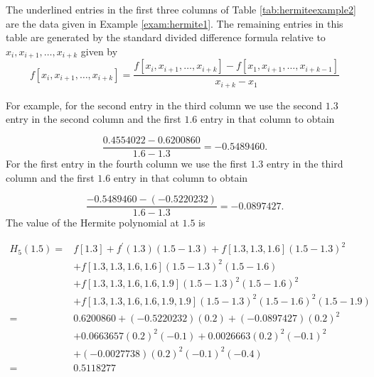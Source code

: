 \begin{mysolution}The underlined entries in the first three columns of Table \ref{tab:hermiteexample2} are the data given in Example \ref{exam:hermite1}. The remaining entries in this table are generated by the standard divided difference formula relative to $x_i, x_{i+1}, \ldots, x_{i+k}$ given by
\[f[x_i, x_{i+1}, \ldots, x_{i+k}]=\frac{f[x_i, x_{i+1}, \ldots, x_{i+k}]-f[x_1, x_{i+1}, \ldots, x_{i+k-1}]}{x_{i+k}-x_1}\]

For example, for the second entry in the third column we use the second $1.3$ entry in the second column and the first $1.6$ entry in that column to obtain

$$
\frac{0.4554022-0.6200860}{1.6-1.3}=-0.5489460 .
$$
For the first entry in the fourth column we use the first $1.3$ entry in the third column and the first $1.6$ entry in that column to obtain

$$
\frac{-0.5489460-(-0.5220232)}{1.6-1.3}=-0.0897427 .
$$
The value of the Hermite polynomial at $1.5$ is

$$
\begin{aligned}
H_{5}(1.5)= & f[1.3]+f^{\prime}(1.3)(1.5-1.3)+f[1.3,1.3,1.6](1.5-1.3)^{2} \\
& +f[1.3,1.3,1.6,1.6](1.5-1.3)^{2}(1.5-1.6) \\
& +f[1.3,1.3,1.6,1.6,1.9](1.5-1.3)^{2}(1.5-1.6)^{2} \\
& +f[1.3,1.3,1.6,1.6,1.9,1.9](1.5-1.3)^{2}(1.5-1.6)^{2}(1.5-1.9) \\
= & 0.6200860+(-0.5220232)(0.2)+(-0.0897427)(0.2)^{2} \\
& +0.0663657(0.2)^{2}(-0.1)+0.0026663(0.2)^{2}(-0.1)^{2} \\
& +(-0.0027738)(0.2)^{2}(-0.1)^{2}(-0.4) \\
= & 0.5118277
\end{aligned}
$$
\end{mysolution}
%
